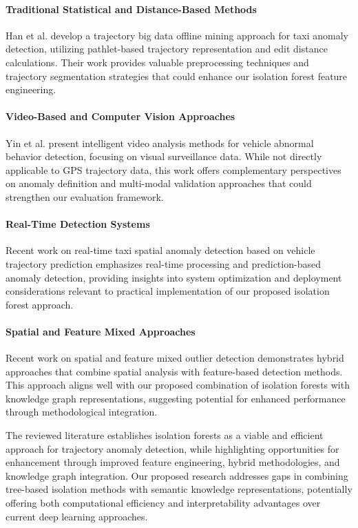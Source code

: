 \documentclass[runningheads]{llncs}
\begin{document}
\paragraph{Traditional Statistical and Distance-Based Methods}
Han et al. develop a trajectory big data offline mining approach for taxi anomaly detection, utilizing pathlet-based trajectory representation and edit distance calculations. Their work provides valuable preprocessing techniques and trajectory segmentation strategies that could enhance our isolation forest feature engineering.

\paragraph{Video-Based and Computer Vision Approaches}
Yin et al. present intelligent video analysis methods for vehicle abnormal behavior detection, focusing on visual surveillance data. While not directly applicable to GPS trajectory data, this work offers complementary perspectives on anomaly definition and multi-modal validation approaches that could strengthen our evaluation framework.

\paragraph{Real-Time Detection Systems}
Recent work on real-time taxi spatial anomaly detection based on vehicle trajectory prediction emphasizes real-time processing and prediction-based anomaly detection, providing insights into system optimization and deployment considerations relevant to practical implementation of our proposed isolation forest approach.

\paragraph{Spatial and Feature Mixed Approaches}
Recent work on spatial and feature mixed outlier detection demonstrates hybrid approaches that combine spatial analysis with feature-based detection methods. This approach aligns well with our proposed combination of isolation forests with knowledge graph representations, suggesting potential for enhanced performance through methodological integration.

The reviewed literature establishes isolation forests as a viable and efficient approach for trajectory anomaly detection, while highlighting opportunities for enhancement through improved feature engineering, hybrid methodologies, and knowledge graph integration. Our proposed research addresses gaps in combining tree-based isolation methods with semantic knowledge representations, potentially offering both computational efficiency and interpretability advantages over current deep learning approaches.
\end{document}
